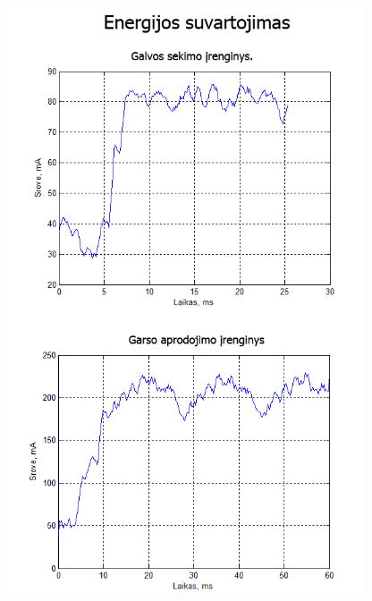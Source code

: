 \documentclass[]{vgtuef}
\begin{document}
\begin{figure}[!h]
  \centering
  \includegraphics[width=400px]{img/rez1.png}
\end{figure}
\end{document}
